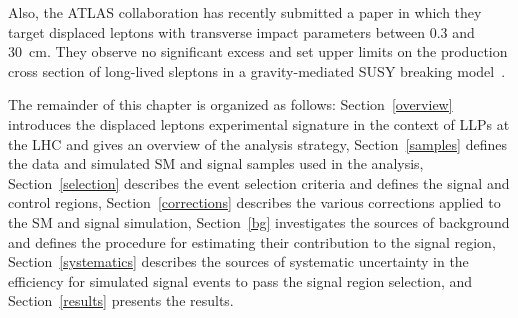 Also, the ATLAS collaboration has recently submitted a paper in which they target displaced leptons with transverse impact parameters between \num{0.3} and \SI{30}{\cm}. They observe no significant excess and set upper limits on the production cross section of long-lived sleptons in a gravity-mediated SUSY breaking model~\cite{atlas_displaced_leptons}.

The remainder of this chapter is organized as follows: Section~\ref{overview} introduces the displaced leptons experimental signature in the context of LLPs at the LHC and gives an overview of the analysis strategy, Section~\ref{samples} defines the data and simulated SM and signal samples used in the analysis, Section~\ref{selection} describes the event selection criteria and defines the signal and control regions, Section~\ref{corrections} describes the various corrections applied to the SM and signal simulation, Section~\ref{bg} investigates the sources of background and defines the procedure for estimating their contribution to the signal region, Section~\ref{systematics} describes the sources of systematic uncertainty in the efficiency for simulated signal events to pass the signal region selection, and Section~\ref{results} presents the results.








